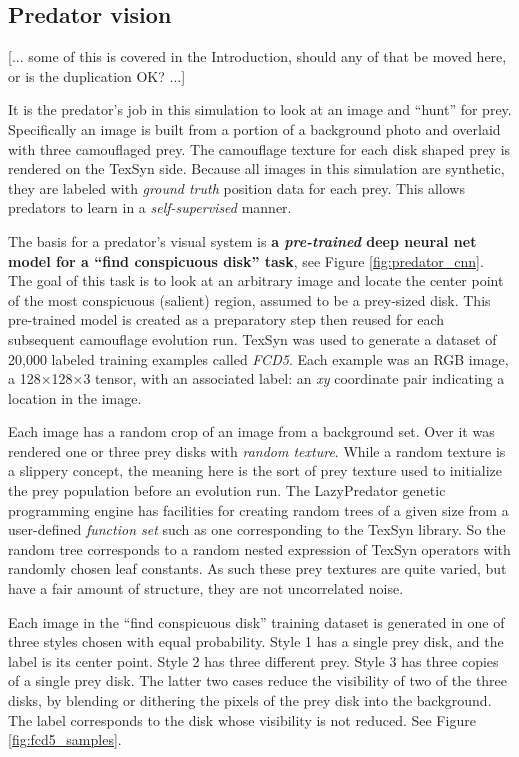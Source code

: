\documentclass[acmtog]{acmart}
\newcommand{\jargon}[1]{\textit{#1}}
\begin{document}
\subsection{Predator vision}
[... some of this is covered in the Introduction, should any of that be moved here, or is the duplication OK? ...]
\par
It is the predator's job in this simulation to look at an image and “hunt” for prey. Specifically an image is built from a portion of a background photo and overlaid with three camouflaged prey. The camouflage texture for each disk shaped prey is rendered on the TexSyn side. Because all images in this simulation are synthetic, they are labeled with \jargon{ground truth} position data for each prey. This allows predators to learn in a \jargon{self-supervised} manner.
\par
The basis for a predator's visual system is \textbf{a \jargon{pre-trained} deep neural net model for a “find conspicuous disk” task}, see Figure \ref{fig:predator_cnn}. The goal of this task is to look at an arbitrary image and locate the center point of the most conspicuous (salient) region, assumed to be a prey-sized disk. This pre-trained model is created as a preparatory step then reused for each subsequent camouflage evolution run. TexSyn was used to generate a dataset of 20,000 labeled training examples called \jargon{FCD5}. Each example was an RGB image, a 128×128×3 tensor, with an associated label: an \textit{xy} coordinate pair indicating a location in the image.
\par
Each image has a random crop of an image from a background set. Over it was rendered one or three prey disks with \jargon{random texture}. While a random texture is a slippery concept, the meaning here is the sort of prey texture used to initialize the prey population before an evolution run. The LazyPredator genetic programming engine has facilities for creating random trees of a given size from a user-defined \jargon{function set} such as one corresponding to the TexSyn library. So the random tree corresponds to a random nested expression of TexSyn operators with randomly chosen leaf constants. As such these prey textures are quite varied, but have a fair amount of structure, they are not uncorrelated noise.
\par
Each image in the “find conspicuous disk” training dataset is generated in one of three styles chosen with equal probability. Style 1 has a single prey disk, and the label is its center point. Style 2 has three different prey. Style 3 has three copies of a single prey disk. The latter two cases reduce the visibility of two of the three disks, by blending or dithering the pixels of the prey disk into the background. The label corresponds to the disk whose visibility is not reduced. See Figure \ref{fig:fcd5_samples}.
\end{document}
